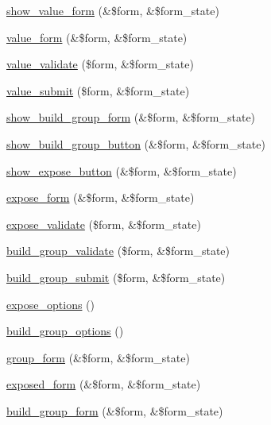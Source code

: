 \begin{DoxyCompactItemize}
\item 
\hyperlink{classviews__handler__filter_a37f4961abdb70886be8229fbfa35038a}{show\_\-value\_\-form} (\&\$form, \&\$form\_\-state)
\item 
\hyperlink{classviews__handler__filter_a9168b39edae84b20e01a3fd0d810ba66}{value\_\-form} (\&\$form, \&\$form\_\-state)
\item 
\hyperlink{classviews__handler__filter_a55b051bcd047b7251e6dbbece8e0a081}{value\_\-validate} (\$form, \&\$form\_\-state)
\item 
\hyperlink{classviews__handler__filter_ae71b3b09b75932ec6a8db33d56d41035}{value\_\-submit} (\$form, \&\$form\_\-state)
\item 
\hyperlink{classviews__handler__filter_a84a939dda3daf1c9c8f97058684271d2}{show\_\-build\_\-group\_\-form} (\&\$form, \&\$form\_\-state)
\item 
\hyperlink{classviews__handler__filter_a453c04cda91e955d5ea522044353c331}{show\_\-build\_\-group\_\-button} (\&\$form, \&\$form\_\-state)
\item 
\hyperlink{classviews__handler__filter_afa388297472d32d4bcb976bf3515d16a}{show\_\-expose\_\-button} (\&\$form, \&\$form\_\-state)
\item 
\hyperlink{classviews__handler__filter_a9537c9a30fb9008361efdfdde46633cd}{expose\_\-form} (\&\$form, \&\$form\_\-state)
\item 
\hyperlink{classviews__handler__filter_a30b7f718c7c152dfedb3fc444bd1304c}{expose\_\-validate} (\$form, \&\$form\_\-state)
\item 
\hyperlink{classviews__handler__filter_a301d05b76bbcfcf5e45cc2e802714759}{build\_\-group\_\-validate} (\$form, \&\$form\_\-state)
\item 
\hyperlink{classviews__handler__filter_a0ddaf64d794c4d54d0e3fcc29265d791}{build\_\-group\_\-submit} (\$form, \&\$form\_\-state)
\item 
\hyperlink{classviews__handler__filter_a07ab6afc47bf892fb5fd5934c3f1d64c}{expose\_\-options} ()
\item 
\hyperlink{classviews__handler__filter_a632cefd4a30b2fb929cdaeefd945eb98}{build\_\-group\_\-options} ()
\item 
\hyperlink{classviews__handler__filter_a27ce821a21b8b221377d98823a83efff}{group\_\-form} (\&\$form, \&\$form\_\-state)
\item 
\hyperlink{classviews__handler__filter_af97b055d96353032bebd186c66bbb5eb}{exposed\_\-form} (\&\$form, \&\$form\_\-state)
\item 
\hyperlink{classviews__handler__filter_a80c87c1d0b08a8adbeda39b5daf0a5e2}{build\_\-group\_\-form} (\&\$form, \&\$form\_\-state)

\end{DoxyCompactItemize}
